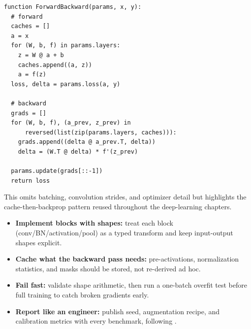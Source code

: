 \begin{tcolorbox}[summarybox, title={MLP/CNN block pseudocode (schematic)}]
\footnotesize
\begin{verbatim}
function ForwardBackward(params, x, y):
  # forward
  caches = []
  a = x
  for (W, b, f) in params.layers:
    z = W @ a + b
    caches.append((a, z))
    a = f(z)
  loss, delta = params.loss(a, y)

  # backward
  grads = []
  for (W, b, f), (a_prev, z_prev) in
      reversed(list(zip(params.layers, caches))):
    grads.append((delta @ a_prev.T, delta))
    delta = (W.T @ delta) * f'(z_prev)

  params.update(grads[::-1])
  return loss
\end{verbatim}
\normalsize
This omits batching, convolution strides, and optimizer detail but highlights the cache-then-backprop pattern reused throughout the deep-learning chapters.
\end{tcolorbox}

\begin{tcolorbox}[summarybox, title={Derivation closure: implement, cache, and fail fast}]
\begin{itemize}
    \item \textbf{Implement blocks with shapes:} treat each block (conv/BN/activation/pool) as a typed transform and keep input-output shapes explicit.
    \item \textbf{Cache what the backward pass needs:} pre-activations, normalization statistics, and masks should be stored, not re-derived ad hoc.
    \item \textbf{Fail fast:} validate shape arithmetic, then run a one-batch overfit test before full training to catch broken gradients early.
    \item \textbf{Report like an engineer:} publish seed, augmentation recipe, and calibration metrics with every benchmark, following .
\end{itemize}
\end{tcolorbox}

